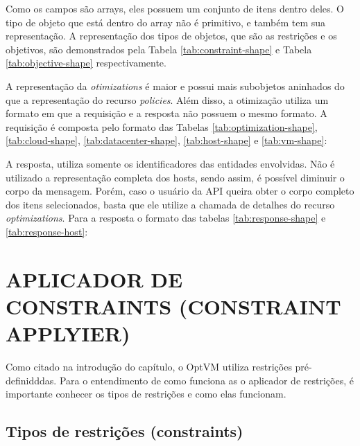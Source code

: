 

Como os campos são arrays, eles possuem um conjunto de itens dentro deles. O tipo
de objeto que está dentro do array não é primitivo, e também tem sua representação.
A representação dos tipos de objetos, que são as restrições e os objetivos, são demonstrados
pela Tabela \ref{tab:constraint-shape} e Tabela \ref{tab:objective-shape} respectivamente.




A representação da \textit{otimizations} é maior e possui mais subobjetos aninhados
do que a representação do recurso \textit{policies}. Além disso, a otimização utiliza 
um formato em que a requisição e a resposta não possuem o mesmo formato. A requisição
é composta pelo formato das Tabelas \ref{tab:optimization-shape}, \ref{tab:cloud-shape},
\ref{tab:datacenter-shape}, \ref{tab:host-shape} e \ref{tab:vm-shape}:







A resposta, utiliza somente os identificadores das entidades envolvidas. Não
é utilizado a representação completa dos hosts, sendo assim, é possível
diminuir o corpo da mensagem. Porém, caso o usuário da API queira obter 
o corpo completo dos itens selecionados, basta que ele utilize a chamada de 
detalhes do recurso \textit{optimizations}. Para a resposta o formato das
tabelas \ref{tab:response-shape} e \ref{tab:response-host}:




\section{APLICADOR DE CONSTRAINTS (CONSTRAINT APPLYIER)}

Como citado na introdução do capítulo, o OptVM utiliza restrições pré-definidddas.
Para o entendimento de como funciona as o aplicador de restrições, é importante conhecer os tipos de 
restrições e como elas funcionam.

\subsection{Tipos de restrições (constraints)}

